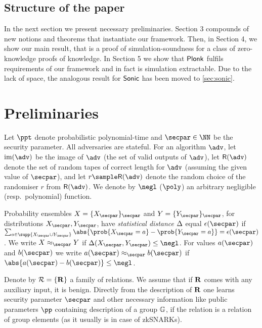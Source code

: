 \let\accentvec\vec \documentclass[runningheads]{llncs}
\begin{document}
\subsection{Structure of the paper}
In the next section we present necessary preliminaries. Section 3 compounds of
new notions and theorems that instantiate our framework. Then, in Section 4, we
show our main result, that is a proof of simulation-soundness for a class of
zero-knowledge proofs of knowledge. In Section 5 we show that $\textnormal{\textsf{Plonk}}$ fulfils
requirements of our framework and in fact is simulation extractable. Due to the
lack of space, the analogous result for ${\textnormal{\textsf{Sonic}}}$ has been moved to
\cref{sec:sonic}.

\section{Preliminaries}
\label{sec:preliminaries}
Let $\ppt$ denote probabilistic polynomial-time and $\secpar \in \NN$ be the
security parameter. All adversaries are stateful. For an algorithm $\adv$, let
$\image (\adv)$ be the image of $\adv$ (the set of valid outputs of $\adv$), let
$\RND{\adv}$ denote the set of random tapes of correct length for $\adv$
(assuming the given value of $\secpar$), and let $r \sample \RND{\adv}$ denote
the random choice of the randomiser $r$ from $\RND{\adv}$. We denote by $\negl$
($\poly$) an arbitrary negligible (resp.~polynomial) function.

Probability ensembles $X = \smallset{X_\secpar}_\secpar$ and $Y =
\smallset{Y_\secpar}_\secpar$, for distributions $X_\secpar, Y_\secpar$, have
\emph{statistical distance} $\Delta$ equal $\epsilon(\secpar)$ if $\sum_{a \in
  \supp{X_\secpar \cup Y_\secpar}} \abs{\prob{X_\secpar = a} - \prob{Y_\secpar =
    a}} = \epsilon(\secpar)$. We write $X \approx_\secpar Y$ if $\SD(X_\secpar,
Y_\secpar) \leq \negl$. For values $a(\secpar)$ and $b(\secpar)$ we write
$a(\secpar) \approx_\secpar b(\secpar)$ if $\abs{a(\secpar) - b(\secpar)} \leq
\negl$.

Denote by $\mathcal{R} = \{\mathbf{R}\}$ a family of relations. We assume that if
$\mathbf{R}$ comes with any auxiliary input, it is benign. Directly from the
description of $\mathbf{R}$ one learns security parameter $\secpar$ and other
necessary information like public parameters $\pp$ containing description of a
group $\mathbb{G}$, if the relation is a relation of group elements (as it usually is
in case of zkSNARKs).
\end{document}
